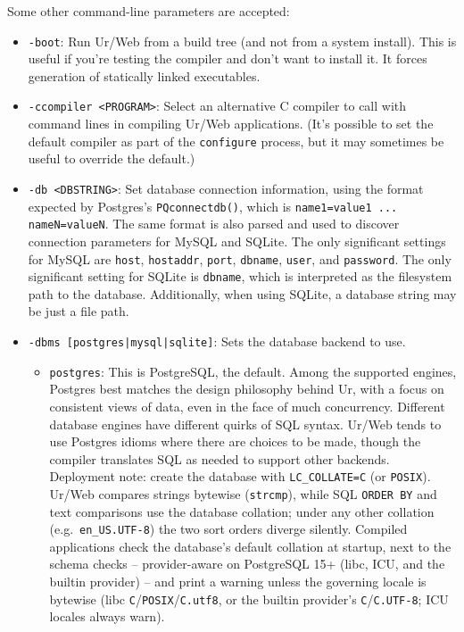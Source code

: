 \documentclass{article}
\begin{document}
Some other command-line parameters are accepted:
\begin{itemize}
\item \texttt{-boot}: Run Ur/Web from a build tree (and not from a system install).  This is useful if you're testing the compiler and don't want to install it.  It forces generation of statically linked executables.

\item \texttt{-ccompiler <PROGRAM>}: Select an alternative C compiler to call with command lines in compiling Ur/Web applications.  (It's possible to set the default compiler as part of the \texttt{configure} process, but it may sometimes be useful to override the default.)

\item \texttt{-db <DBSTRING>}: Set database connection information, using the format expected by Postgres's \texttt{PQconnectdb()}, which is \texttt{name1=value1 ... nameN=valueN}.  The same format is also parsed and used to discover connection parameters for MySQL and SQLite.  The only significant settings for MySQL are \texttt{host}, \texttt{hostaddr}, \texttt{port}, \texttt{dbname}, \texttt{user}, and \texttt{password}.  The only significant setting for SQLite is \texttt{dbname}, which is interpreted as the filesystem path to the database.  Additionally, when using SQLite, a database string may be just a file path.

\item \texttt{-dbms [postgres|mysql|sqlite]}: Sets the database backend to use.
  \begin{itemize}
  \item \texttt{postgres}: This is PostgreSQL, the default.  Among the supported engines, Postgres best matches the design philosophy behind Ur, with a focus on consistent views of data, even in the face of much concurrency.  Different database engines have different quirks of SQL syntax.  Ur/Web tends to use Postgres idioms where there are choices to be made, though the compiler translates SQL as needed to support other backends.  Deployment note: create the database with \texttt{LC\_COLLATE=C} (or \texttt{POSIX}).  Ur/Web compares strings bytewise (\texttt{strcmp}), while SQL \texttt{ORDER BY} and text comparisons use the database collation; under any other collation (e.g.\ \texttt{en\_US.UTF-8}) the two sort orders diverge silently.  Compiled applications check the database's default collation at startup, next to the schema checks -- provider-aware on PostgreSQL 15+ (libc, ICU, and the builtin provider) -- and print a warning unless the governing locale is bytewise (libc \texttt{C}/\texttt{POSIX}/\texttt{C.utf8}, or the builtin provider's \texttt{C}/\texttt{C.UTF-8}; ICU locales always warn).


\end{itemize}
\end{itemize}
\end{document}
